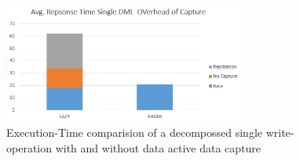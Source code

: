 \begin{figure}[t] 
    \centering 
    \includegraphics[width=0.7\textwidth]{Figures/dml_comp.PNG}
    \caption{Execution-Time comparision of a decompossed  single write-operation with and without data active data capture }
    \label{fig:write_decomposition}
\end{figure}


